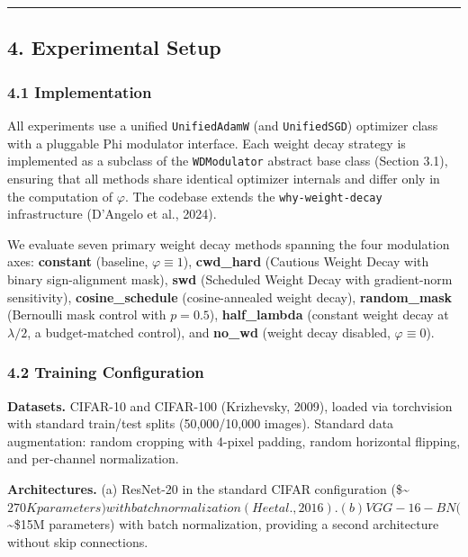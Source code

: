 \documentclass[
]{article}
\begin{document}
\begin{center}\rule{0.5\linewidth}{0.5pt}\end{center}

\hypertarget{experimental-setup}{%
\subsection{4. Experimental Setup}\label{experimental-setup}}

\hypertarget{implementation}{%
\subsubsection{4.1 Implementation}\label{implementation}}

All experiments use a unified \texttt{UnifiedAdamW} (and
\texttt{UnifiedSGD}) optimizer class with a pluggable Phi modulator
interface. Each weight decay strategy is implemented as a subclass of
the \texttt{WDModulator} abstract base class (Section 3.1), ensuring
that all methods share identical optimizer internals and differ only in
the computation of \(\varphi\). The codebase extends the
\texttt{why-weight-decay} infrastructure (D'Angelo et al., 2024).

We evaluate seven primary weight decay methods spanning the four
modulation axes: \textbf{constant} (baseline, \(\varphi \equiv 1\)),
\textbf{cwd\_hard} (Cautious Weight Decay with binary sign-alignment
mask), \textbf{swd} (Scheduled Weight Decay with gradient-norm
sensitivity), \textbf{cosine\_schedule} (cosine-annealed weight decay),
\textbf{random\_mask} (Bernoulli mask control with \(p = 0.5\)),
\textbf{half\_lambda} (constant weight decay at \(\lambda/2\), a
budget-matched control), and \textbf{no\_wd} (weight decay disabled,
\(\varphi \equiv 0\)).

\hypertarget{training-configuration}{%
\subsubsection{4.2 Training
Configuration}\label{training-configuration}}

\textbf{Datasets.} CIFAR-10 and CIFAR-100 (Krizhevsky, 2009), loaded via
torchvision with standard train/test splits (50,000/10,000 images).
Standard data augmentation: random cropping with 4-pixel padding, random
horizontal flipping, and per-channel normalization.

\textbf{Architectures.} (a) ResNet-20 in the standard CIFAR
configuration
(\$\sim\(270K parameters) with batch normalization (He et al., 2016). (b) VGG-16-BN (\)\sim\$15M
parameters) with batch normalization, providing a second architecture
without skip connections.
\end{document}
